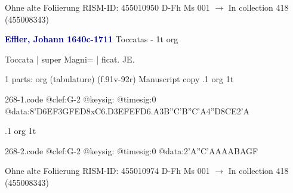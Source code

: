 \documentclass[twocolumn]{book}
\begin{document}
\newline Ohne alte Foliierung
\newline RISM-ID: 455010950
\newline D-Fh  Ms 001
\newline $\rightarrow$ In collection 418 (455008343)
      
\newline \par \vspace{7pt} \textcolor{darkblue}{\textbf{Effler, Johann  1640c-1711}}
\newline Toccatas - 1t
\newline org
\newline \begin{itshape}[f.91v, at left:] Toccata | super Magni= | ficat. JE.\end{itshape} 
\newline \textcolor{darkblue}{}  1 parts: org (tabulature)  (f.91v-92r)
\newline Manuscript copy
.1  org  1t  
\begin{filecontents*}{268-1.code}
@clef:G-2
@keysig:
@timesig:0
@data:{8'D6EF}{3GFED}8xC{6.D3E}{FEFD}{6.A3B}{''C'B''C'A}4''D{8CE}2'A
\end{filecontents*}
\newline
%

.1  org  1t  
\begin{filecontents*}{268-2.code}
@clef:G-2
@keysig:
@timesig:0
@data:2'A''C'AAAABAGF
\end{filecontents*}
\newline
%

\newline Ohne alte Foliierung
\newline RISM-ID: 455010974
\newline D-Fh  Ms 001
\newline $\rightarrow$ In collection 418 (455008343)
      
\end{document}
